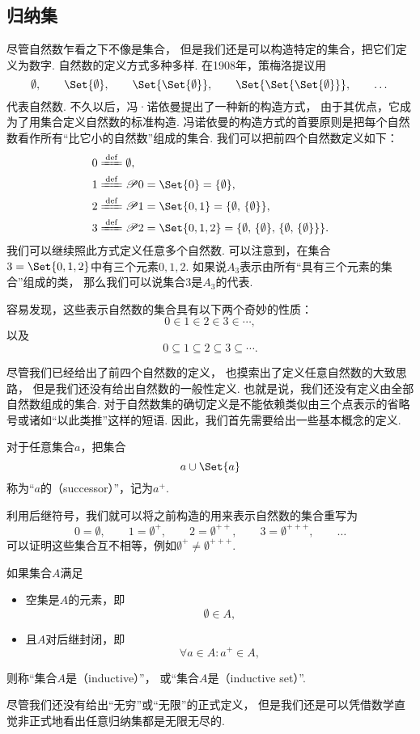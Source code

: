 \subsection{归纳集}
尽管自然数乍看之下不像是集合，
但是我们还是可以构造特定的集合，把它们定义为数字.
自然数的定义方式多种多样.
在1908年，策梅洛提议用\[
	\emptyset, \qquad
	\Set{\emptyset}, \qquad
	\Set{\Set{\emptyset}}, \qquad
	\Set{\Set{\Set{\emptyset}}}, \qquad
	\dotsc
\]代表自然数.
不久以后，冯·诺依曼提出了一种新的构造方式，
由于其优点，它成为了用集合定义自然数的标准构造.
冯诺依曼的构造方式的首要原则是把每个自然数看作所有“比它小的自然数”组成的集合.
我们可以把前四个自然数定义如下：\begin{align*}
	&0 \defeq \emptyset, \\
	&1 \defeq \Powerset0 = \Set{0} = \NaturalSet{1}, \\
	&2 \defeq \Powerset1 = \Set{0,1} = \NaturalSet{2}, \\
	&3 \defeq \Powerset2 = \Set{0,1,2} = \NaturalSet{3}.
\end{align*}
我们可以继续照此方式定义任意多个自然数.
可以注意到，在集合\(3=\Set{0,1,2}\)中有三个元素\(0,1,2\).
如果说\(A_3\)表示由所有“具有三个元素的集合”组成的类，
那么我们可以说集合\(3\)是\(A_3\)的代表.

容易发现，这些表示自然数的集合具有以下两个奇妙的性质：\[
	0 \in 1 \in 2 \in 3 \in \dotsb,
\]
以及\[
	0 \subseteq 1 \subseteq 2 \subseteq 3 \subseteq \dotsb.
\]

尽管我们已经给出了前四个自然数的定义，
也摸索出了定义任意自然数的大致思路，
但是我们还没有给出自然数的一般性定义.
也就是说，我们还没有定义由全部自然数组成的集合.
对于自然数集的确切定义是不能依赖类似由三个点表示的省略号或诸如“以此类推”这样的短语.
因此，我们首先需要给出一些基本概念的定义.
\begin{definition}[后继]\label{definition:集合论.后继的定义}
对于任意集合\(a\)，把集合\[
	a \cup \Set{a}
\]
称为“\(a\)的（successor）”，记为\(a^+\).
\end{definition}

利用后继符号，我们就可以将之前构造的用来表示自然数的集合重写为\[
	0=\emptyset, \qquad
	1=\emptyset^+, \qquad
	2=\emptyset^{++}, \qquad
	3=\emptyset^{+++}, \qquad
	\dotsc
\]
可以证明这些集合互不相等，例如\(\emptyset^+\neq\emptyset^{+++}\).

\begin{definition}[归纳集]\label{definition:集合论.归纳集的定义}
如果集合\(A\)满足
\begin{itemize}
	\item 空集是\(A\)的元素，即\[
		\emptyset \in A,
	\]
	\item 且\(A\)对后继封闭，即\[
		\forall a \in A : a^+ \in A,
	\]
\end{itemize}
则称“集合\(A\)是（inductive）”，
或“集合\(A\)是（inductive set）”.
\end{definition}
尽管我们还没有给出“无穷”或“无限”的正式定义，
但是我们还是可以凭借数学直觉非正式地看出任意归纳集都是无限无尽的.

